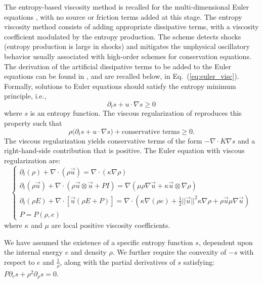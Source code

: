 \documentclass[12pt]{article}
\newcommand{\eqt}[1]{Eq.~(\ref{#1})} %
\renewcommand{\div}{\nabla \cdot}
\newcommand{\grad}{\nabla}
\begin{document}
The entropy-based viscosity method \cite{valentin, jlg1, jlg2} is recalled for the multi-dimensional Euler equations \cite{Toro}, with no source or friction terms added at this stage. The entropy viscosity method consists of adding appropriate dissipative terms, with a viscosity coefficient modulated by the entropy production. The scheme detects shocks (entropy production is large in shocks) and mitigates the unphysical oscillatory behavior usually associated with high-order schemes for conservation equations. The derivation of the artificial dissipative terms to be added to the Euler equations can be found in \cite{jlg}, and are recalled below, in \eqt{eq:euler_visc}. Formally, solutions to Euler equations should satisfy the entropy minimum principle, i.e., 
\begin{equation}
\partial _t s + u \cdot \grad s \ge 0 
\end{equation}
where $s$ is an entropy function. The viscous regularization of \cite{jlg} reproduces this property such that
\begin{equation}
\rho \big( \partial _t s + u \cdot \grad s \big) + \text{conservative terms} \ge 0 .
\end{equation}
The viscous regularization yields conservative terms of the form $-\div K \grad s$ and a right-hand-side contribution that is positive. The Euler equation with viscous regularization are:
\begin{equation}
\label{eq:euler_visc}
\left\{ 
\begin{array}{lll}
\partial_t \left( \rho \right) + \nabla \cdot \left( \rho \vec{u} \right) = \nabla \cdot \left( \kappa \nabla \rho \right) \\
\partial_t \left( \rho \vec{u} \right) + \nabla \cdot \left( \rho \vec{u} \otimes \vec{u} + P I \right) = \nabla \left( \mu \rho \nabla \vec{u}  + \kappa \vec{u} \otimes \nabla \rho \right)  \\
\partial_t \left( \rho E \right) + \nabla \cdot \left[ \vec{u} \left( \rho E + P \right) \right] = \nabla \cdot \left( \kappa \nabla \left( \rho e \right) + \frac{1}{2}|| \vec{u} ||^2 \kappa \nabla \rho +  \rho \vec{u} \mu \nabla \vec{u}  \right) \\
P = P\left( \rho, e \right)
\end{array}
\right.
\end{equation}
where $\kappa$ and $\mu$ are local positive viscosity coefficients.

We have assumed the existence of a specific entropy function $s$, dependent upon the internal energy $e$ and density $\rho$.  We further require the convexity of $-s$ with respect to $e$ and $\frac{1}{\rho}$, along with the partial derivatives of $s$ satisfying: $P \partial_e s + \rho^2 \partial_{\rho} s = 0$.
\end{document}
